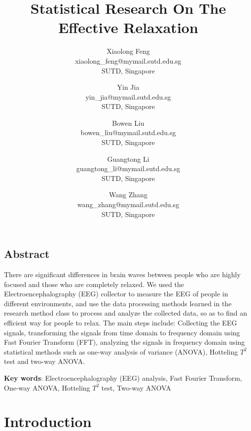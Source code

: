 \documentclass[letterpaper,twocolumn,10pt]{article}
\begin{document}
\date{}

\title{\Large \bf Statistical Research On The Effective Relaxation}

\author{
{\rm Xiaolong Feng}\\
xiaolong\_feng@mymail.sutd.edu.sg\\
SUTD, Singapore
\and
{\rm Yin Jia}\\
yin\_jia@mymail.sutd.edu.sg\\
SUTD, Singapore
\and
{\rm Bowen Liu}\\
bowen\_liu@mymail.sutd.edu.sg\\
SUTD, Singapore
\and
{\rm Guangtong Li}\\
guangtong\_li@mymail.sutd.edu.sg\\
SUTD, Singapore
\and
{\rm Wang Zhang}\\
wang\_zhang@mymail.sutd.edu.sg\\
SUTD, Singapore
}

\maketitle

\thispagestyle{empty}

\subsection*{Abstract}
There are significant differences in brain waves between people who are highly focused and those who are completely relaxed. We used the Electroencephalography (EEG) collector to measure the EEG of people in different environments, and use the data processing methods learned in the research method class to process and analyze the collected data, so as to find an efficient way for people to relax. The main steps include: Collecting the EEG signals, transforming the signals from time domain to frequency domain using Fast Fourier Transform (FFT), analyzing the signals in frequency domain using statistical methods such as one-way analysis of variance (ANOVA), Hotteling $T^2$ test and two-way ANOVA.


\textbf{Key words}: Electroencephalography (EEG) analysis, Fast Fourier Transform, One-way ANOVA, Hotteling $T^2$ test, Two-way ANOVA


\section{Introduction}
\end{document}
